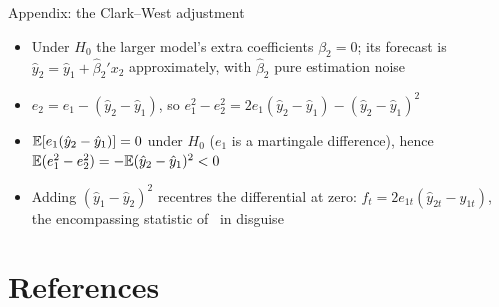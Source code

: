 \begin{frame}{Appendix: the Clark--West adjustment}
\hypertarget{atsapp3}{}
\itemsize{\small}
\begin{itemize}
    \item Under $H_0$ the larger model's extra coefficients $\beta_2 = 0$; its forecast is $\hat y_2 = \hat y_1 + \hat\beta_2'x_{2}$ approximately, with $\hat\beta_2$ pure estimation noise
    \item $e_2 = e_1 - (\hat y_2 - \hat y_1)$, so $e_1^2 - e_2^2 = 2e_1(\hat y_2 - \hat y_1) - (\hat y_2 - \hat y_1)^2$
    \item $\mathbb{E}[e_1(\hat y_2 - \hat y_1)] = 0$ under $H_0$ ($e_1$ is a martingale difference), hence $\mathbb{E}(e_1^2 - e_2^2) = -\mathbb{E}(\hat y_2 - \hat y_1)^2 < 0$
    \item Adding $(\hat y_1 - \hat y_2)^2$ recentres the differential at zero: $f_t = 2e_{1t}(\hat y_{2t} - \hat y_{1t})$, the encompassing statistic of \ in disguise
\end{itemize}
\end{frame}


\section{References}

